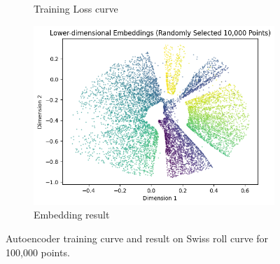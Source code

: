 \begin{itemize}
\begin{itemize}
\begin{figure}[H]
\begin{subfigure}{0.45\textwidth}
	      		\caption{Training Loss curve}
	      		\label{fig:autoencoder-training-100k}
	      	\end{subfigure}
	      	\begin{subfigure}{0.45\textwidth}
	      		\includegraphics[width=\linewidth]{images/autoencoder_result_100k.png}
	      		\caption{Embedding result}
	      		\label{fig:autoencoder-result-100k}
	      	\end{subfigure}
	      	\label{fig:autoencoder-100k}
	      	\caption{Autoencoder training curve and result on Swiss roll curve for 100,000 points.}
	      \end{figure}


\end{itemize}
\end{itemize}
